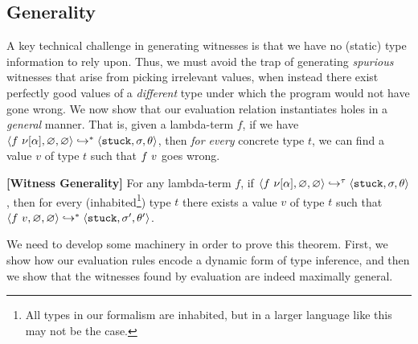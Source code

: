 


\subsection{Generality}\label{sec:soundness}

A key technical challenge in generating witnesses is
that we have no (static) type information to rely upon.
%
Thus, we must avoid the trap of generating \emph{spurious}
witnesses that arise from picking irrelevant values, when
instead there exist perfectly good values of a \emph{different}
type under which the program would not have gone wrong.
%
We now show that our evaluation relation instantiates holes
in a \emph{general} manner. That is, given a lambda-term $f$,
if we have $\langle f\ \nu[\alpha], \varnothing, \varnothing \rangle \hookrightarrow^{*} \langle \mathtt{stuck}, \sigma, \theta \rangle{}$,
then \emph{for every} concrete type $t$, we can find a value
$v$ of type $t$ such that $f\ v$ goes wrong.

\begin{thm}{\textbf{[Witness Generality]}}
\label{thm:soundness}
  For any lambda-term $f$, if
  \hbox{$\langle f\ \nu[\alpha], \varnothing, \varnothing \rangle \hookrightarrow^{\tau} \langle \mathtt{stuck}, \sigma, \theta \rangle$,}
  then for every
  (inhabited\footnote{All types in our formalism are inhabited, but in a larger language like \ocaml this may not be the case.})
  type
  $t$ there exists a value $v$ of type $t$ such that
  $\langle f\ v, \varnothing, \varnothing \rangle \hookrightarrow^{*} \langle \mathtt{stuck}, \sigma', \theta' \rangle{}$.
\end{thm}

We need to develop some machinery in order to prove this theorem.
First, we show how our evaluation rules encode a dynamic form of
type inference, and then we show that the witnesses found by
evaluation are indeed maximally general.

